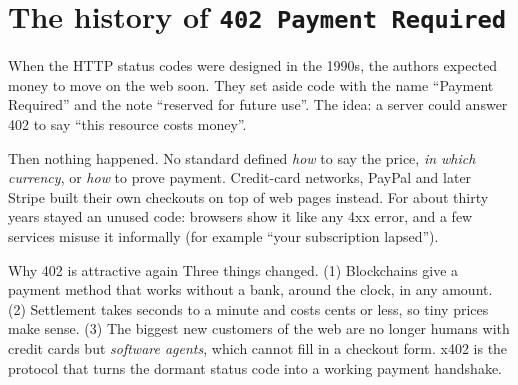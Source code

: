 \section{The history of \texttt{402 Payment Required}}
When the HTTP status codes were designed in the 1990s, the authors expected money to move on the web soon. They set aside code  with the name ``Payment Required'' and the note ``reserved for future use''. The idea: a server could answer 402 to say ``this resource costs money''.

Then nothing happened. No standard defined \emph{how} to say the price, \emph{in which currency}, or \emph{how} to prove payment. Credit-card networks, PayPal and later Stripe built their own checkouts on top of web pages instead. For about thirty years  stayed an unused code: browsers show it like any 4xx error, and a few services misuse it informally (for example ``your subscription lapsed'').

\begin{center}
\end{center}

\begin{conceptbox}{Why 402 is attractive again}
Three things changed. (1) Blockchains give a payment method that works without a bank, around the clock, in any amount. (2) Settlement takes seconds to a minute and costs cents or less, so tiny prices make sense. (3) The biggest new customers of the web are no longer humans with credit cards but \emph{software agents}, which cannot fill in a checkout form. x402 is the protocol that turns the dormant status code into a working payment handshake.
\end{conceptbox}

